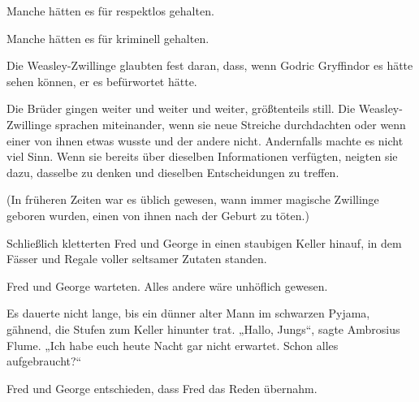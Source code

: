Manche hätten es für respektlos gehalten.

Manche hätten es für kriminell gehalten.

Die Weasley-Zwillinge glaubten fest daran, dass, wenn Godric Gryffindor es hätte sehen können, er es befürwortet hätte.

Die Brüder gingen weiter und weiter und weiter, größtenteils still. Die Weasley-Zwillinge sprachen miteinander, wenn sie neue Streiche durchdachten oder wenn einer von ihnen etwas wusste und der andere nicht. Andernfalls machte es nicht viel Sinn. Wenn sie bereits über dieselben Informationen verfügten, neigten sie dazu, dasselbe zu denken und dieselben Entscheidungen zu treffen.

(In früheren Zeiten war es üblich gewesen, wann immer magische Zwillinge geboren wurden, einen von ihnen nach der Geburt zu töten.)

Schließlich kletterten Fred und George in einen staubigen Keller hinauf, in dem Fässer und Regale voller seltsamer Zutaten standen.

Fred und George warteten. Alles andere wäre unhöflich gewesen.

Es dauerte nicht lange, bis ein dünner alter Mann im schwarzen Pyjama, gähnend, die Stufen zum Keller hinunter trat.
„Hallo, Jungs“, sagte Ambrosius Flume.
„Ich habe euch heute Nacht gar nicht erwartet. Schon alles aufgebraucht?“

Fred und George entschieden, dass Fred das Reden übernahm.

